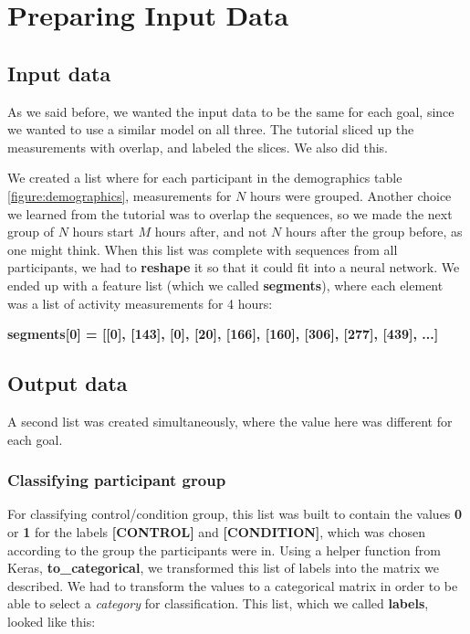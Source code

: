 \section{Preparing Input Data}

\subsection{Input data}

As we said before, we wanted the input data to be the same for each goal, since we wanted to use a similar model on all three.
The tutorial \cite{1d_cnn} sliced up the measurements with overlap, and labeled the slices. We also did this.

We created a list where for each participant in the demographics table \ref{figure:demographics}, measurements for $N$ hours were grouped. 
Another choice we learned from the tutorial was to overlap the sequences, so we made the next group of $N$ hours start \textit{$M$} hours after, 
and not \textit{$N$} hours after the group before, as one might think. When this list was complete with sequences from all participants, we 
had to \textbf{reshape} it so that it could fit into a neural network. We ended up with a feature list (which we called \textbf{segments}), 
where each element was a list of activity measurements for 4 hours: 

\textbf{segments[0] = [[0], [143], [0], [20], [166], [160], [306], [277], [439], ...]}

\subsection{Output data}

A second list was created simultaneously, where the value here was different for each goal. 

\subsubsection{Classifying participant group}

For classifying control/condition group, this list was built to contain the values \textbf{0} or \textbf{1} for the labels \textbf{[CONTROL]} and \textbf{[CONDITION]}, which was chosen according to the group the participants were in. Using a helper function from Keras, \textbf{to\_categorical}, we transformed this list of labels into the matrix we described. We had to transform the values to a categorical matrix in order to be able to select a \textit{category} for classification. This list, which we called \textbf{labels}, looked like this: 

